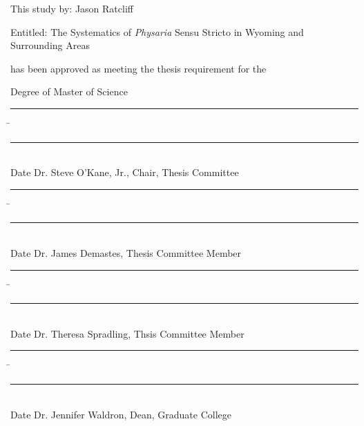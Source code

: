 \clearpage
\pagestyle{contents} %
\setcounter{page}{2}    %
This study by: Jason Ratcliff

Entitled: The Systematics of \textit{Physaria} Sensu Stricto in Wyoming and Surrounding Areas

\vspace*{33pt}

has been approved as meeting the thesis requirement for the

Degree of Master of Science

\vspace*{22pt}

\singlespacing
\begin{noindent}
\begin{tabbing}
\rule{2.4cm}{0.4pt} \hspace{1.33782cm} \= \rule{11cm}{0.4pt}\\
Date \> Dr. Steve O'Kane, Jr., Chair, Thesis Committee\\
\end{tabbing}

\begin{tabbing}
\rule{2.4cm}{0.4pt} \hspace{1.33782cm} \= \rule{11cm}{0.4pt}\\
Date \> Dr. James Demastes, Thesis Committee Member\\
\end{tabbing}

\begin{tabbing}
\rule{2.4cm}{0.4pt} \hspace{1.33782cm} \= \rule{11cm}{0.4pt}\\
Date \> Dr. Theresa Spradling, Thsis Committee Member\\
\end{tabbing}

\begin{tabbing}
\rule{2.4cm}{0.4pt} \hspace{1.33782cm} \= \rule{11cm}{0.4pt}\\
Date \> Dr. Jennifer Waldron, Dean, Graduate College\\
\end{tabbing}
\end{noindent}
\doublespacing
